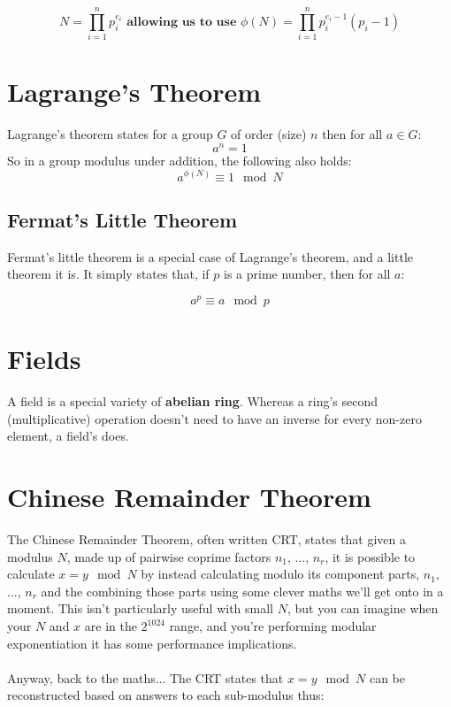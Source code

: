     $$N = \prod_{i=1}^{n}p_{i}^{e_{i}} \textbf{ allowing us to use } \phi(N) = \prod_{i=1}^{n}p_{i}^{e_{i}-1}(p_{i} - 1)$$


    \section{Lagrange's Theorem}
        Lagrange's theorem states for a group $G$ of order (size) $n$ then for all $a \in G$:
        $$a^{n} = 1$$
        So in a group modulus under addition, the following also holds: 
        $$ a^{\phi(N)} \equiv 1 \mod N$$ 
    
        \subsection{Fermat's Little Theorem}
            Fermat's little theorem is a special case of Lagrange's theorem, and a little theorem it is. It simply states that, if $p$ is a prime number, then for all $a$:

            $$ a^p \equiv a \mod p $$
        
    \section{Fields}
        A field is a special variety of \textbf{abelian ring}. Whereas a ring's second (multiplicative) operation doesn't need to have an inverse for every non-zero element, a field's does. 
    
    \section{Chinese Remainder Theorem}
        The Chinese Remainder Theorem, often written CRT, states that given a modulus $N$, made up of pairwise coprime factors $n_1$, ..., $n_r$, it is possible to calculate $x = y \mod N$ by instead calculating modulo its component parts, $n_1$, ..., $n_r$ and the combining those parts using some clever maths we'll get onto in a moment. This isn't particularly useful with small $N$, but you can imagine when your $N$ and $x$ are in the $2^{1024}$ range, and you're performing modular exponentiation it has some performance implications.\\
        \\
        Anyway, back to the maths... The CRT states that $x = y \mod N$ can be reconstructed based on answers to each sub-modulus thus:

